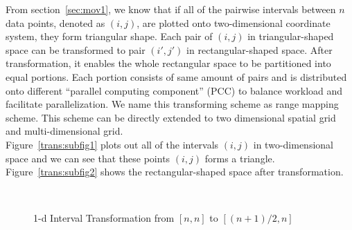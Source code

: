\documentclass[10pt,journal,cspaper,compsoc]{IEEEtran}
\begin{document}
From section~\ref{sec:mov1}, we know that if all of the pairwise intervals between $n$ data points, denoted as $(i,j)$, are plotted onto two-dimensional coordinate system, they form triangular shape. Each pair of $(i,j)$ in triangular-shaped space can be transformed to pair $(i',j')$ in rectangular-shaped space. After transformation, it enables the whole rectangular space to be partitioned into equal portions. Each portion consists of same amount of pairs and is distributed onto different ``parallel computing component'' (PCC) to balance workload and facilitate parallelization. We name this transforming scheme as range mapping scheme. This scheme can be directly extended to two dimensional spatial grid and multi-dimensional grid.\\
Figure~\ref{trans:subfig1} plots out all of the intervals $(i,j)$ in two-dimensional space and we can see that these points $(i,j)$ forms a triangle. Figure~\ref{trans:subfig2} shows the rectangular-shaped space after transformation.
\begin{figure}[h]
\centering
{}
~~
\caption{1-d Interval Transformation from $[n,n]$ to $[(n+1)/2,n]$}\label{modelBF}
\end{figure}
\end{document}
